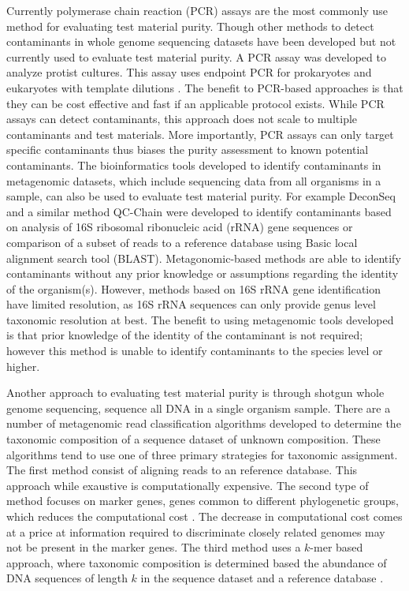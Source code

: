 \documentclass[fleqn,10pt,lineno]{wlpeerj}\usepackage[]{graphicx}\usepackage[]{color}
\begin{document}
Currently polymerase chain reaction (PCR) assays are the most commonly use method for evaluating test material purity. 
Though other methods to detect contaminants in whole genome sequencing datasets have been developed but not currently used to evaluate test material purity.
A PCR assay was developed to analyze protist cultures. 
This assay uses endpoint PCR for prokaryotes and eukaryotes with template dilutions \citep{Marron2013}. 
The benefit to PCR-based approaches is that they can be cost effective and fast if an applicable protocol exists. 
While PCR assays can detect contaminants, this approach does not scale to multiple contaminants and test materials. 
More importantly, PCR assays can only target specific contaminants thus biases the purity assessment to known potential contaminants.
The bioinformatics tools developed to identify contaminants in metagenomic datasets, which include sequencing data from all organisms in a sample, can also be used to evaluate test material purity. 
For example DeconSeq \citep{Schmieder2011} and a similar method QC-Chain \citep{Zhou2013} were developed to identify contaminants based on analysis of 16S ribosomal ribonucleic acid (rRNA) gene sequences or comparison of a subset of reads to a reference database using Basic local alignment search tool (BLAST). 
Metagonomic-based methods are able to identify contaminants without any prior knowledge or assumptions regarding the identity of the organism(s). 
However, methods based on 16S rRNA gene identification have limited resolution, as 16S rRNA sequences can only provide genus level taxonomic resolution at best. 
 The benefit to using metagenomic tools developed is that prior knowledge of the identity of the contaminant is not required; however this method is unable to identify contaminants to the species level or higher.   

Another approach to evaluating test material purity is through shotgun whole genome sequencing, sequence all DNA in a single organism sample. 
There are a number of metagenomic read classification algorithms developed to determine the taxonomic composition of a sequence dataset of unknown composition. These algorithms tend to use one of three primary strategies for taxonomic assignment. The first method consist of aligning reads to an reference database\citep{buchfink2015fast, Francis2013}. This approach while exaustive is computationally expensive. 
The second type of method focuses on marker genes, genes common to different phylogenetic groups, which reduces the computational cost \citep{segata2012metagenomic, liu2011accurate}. 
The decrease in computational cost comes at a price at information required to discriminate closely related genomes may not be present in the marker genes.
The third method uses a $k$-mer based approach, where taxonomic composition is determined based the abundance of DNA sequences of length $k$ in the sequence dataset and a reference database \citep{ounit2015clark, menzel2016fast, wood2014kraken}. 
\end{document}
